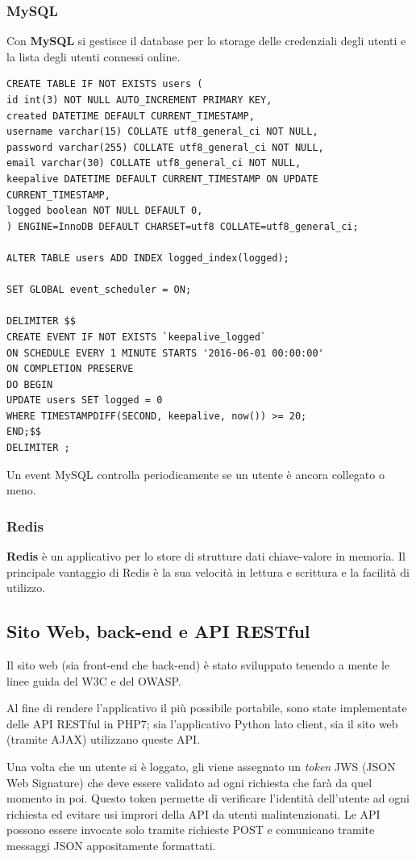 \subsubsection{MySQL}
Con \textbf{MySQL} si gestisce il database per lo storage delle credenziali degli utenti e la lista degli utenti connessi online.
\begin{lstlisting}[frame=none]
CREATE TABLE IF NOT EXISTS users (
id int(3) NOT NULL AUTO_INCREMENT PRIMARY KEY,
created DATETIME DEFAULT CURRENT_TIMESTAMP,
username varchar(15) COLLATE utf8_general_ci NOT NULL,
password varchar(255) COLLATE utf8_general_ci NOT NULL,
email varchar(30) COLLATE utf8_general_ci NOT NULL,
keepalive DATETIME DEFAULT CURRENT_TIMESTAMP ON UPDATE CURRENT_TIMESTAMP,
logged boolean NOT NULL DEFAULT 0,
) ENGINE=InnoDB DEFAULT CHARSET=utf8 COLLATE=utf8_general_ci;

ALTER TABLE users ADD INDEX logged_index(logged);

SET GLOBAL event_scheduler = ON;

DELIMITER $$
CREATE EVENT IF NOT EXISTS `keepalive_logged`
ON SCHEDULE EVERY 1 MINUTE STARTS '2016-06-01 00:00:00'
ON COMPLETION PRESERVE
DO BEGIN
UPDATE users SET logged = 0
WHERE TIMESTAMPDIFF(SECOND, keepalive, now()) >= 20;
END;$$
DELIMITER ;
\end{lstlisting}
Un event MySQL controlla periodicamente se un utente è ancora collegato o meno.

\subsubsection{Redis}
\textbf{Redis} è un applicativo per lo store di strutture dati chiave-valore in memoria. Il principale vantaggio di Redis è la sua velocità in lettura e scrittura e la facilità di utilizzo.

\subsection{Sito Web, back-end e API RESTful}
Il sito web (sia front-end che back-end) è stato sviluppato tenendo a mente le linee guida del W3C e del OWASP.

Al fine di rendere l'applicativo il più possibile portabile, sono state implementate delle API RESTful in PHP7; sia l'applicativo Python lato client, sia il sito web (tramite AJAX) utilizzano queste API.

Una volta che un utente si è loggato, gli viene assegnato un \textit{token} JWS (JSON Web Signature) che deve essere validato ad ogni richiesta che farà da quel momento in poi. Questo token permette di verificare l'identità dell'utente ad ogni richiesta ed evitare usi improri della API da utenti malintenzionati.
Le API possono essere invocate solo tramite richieste POST e comunicano tramite messaggi JSON appositamente formattati.

